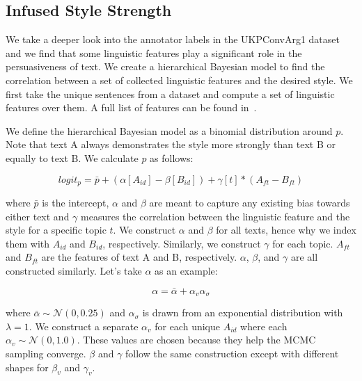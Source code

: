 
\subsection{Infused Style Strength}
\label{sec:style_strength}

We take a deeper look into the annotator labels in the UKPConvArg1 dataset and we find that some linguistic features play a significant role in the persuasiveness of text. We create a hierarchical Bayesian model to find the correlation between a set of collected linguistic features and the desired style. We first take the unique sentences from a dataset and compute a set of linguistic features over them. A full list of features can be found in~.

We define the hierarchical Bayesian model as a binomial distribution around $p$. Note that text A always demonstrates the style more strongly than text B or equally to text B. We calculate $p$ as follows:

\begin{equation}
    logit_p = \bar{p} + (\alpha[A_{id}] - \beta[B_{id}]) + \gamma[t] * (A_{ft} - B_{ft})
\end{equation}

where $\bar{p}$ is the intercept, $\alpha$ and $\beta$ are meant to capture any existing bias towards either text and $\gamma$ measures the correlation between the linguistic feature and the style for a specific topic $t$. We construct $\alpha$ and $\beta$ for all texts, hence why we index them with $A_{id}$ and $B_{id}$, respectively. Similarly, we construct $\gamma$ for each topic. $A_{ft}$ and $B_{ft}$ are the features of text A and B, respectively. $\alpha$, $\beta$, and $\gamma$ are all constructed similarly. Let's take $\alpha$ as an example:

\begin{equation}
    \alpha = \bar{\alpha} + \alpha_{v} \alpha_{\sigma}
\end{equation}

where $\bar{\alpha} \sim \mathcal{N}(0, 0.25)$ and $\alpha_{\sigma}$ is drawn from an exponential distribution with $\lambda = 1$. We construct a separate $\alpha_{v}$ for each unique $A_{id}$ where each $\alpha_{v} \sim \mathcal{N}(0, 1.0)$. These values are chosen because they help the MCMC sampling converge. $\beta$ and $\gamma$ follow the same construction except with different shapes for $\beta_{v}$ and $\gamma_{v}$. 

